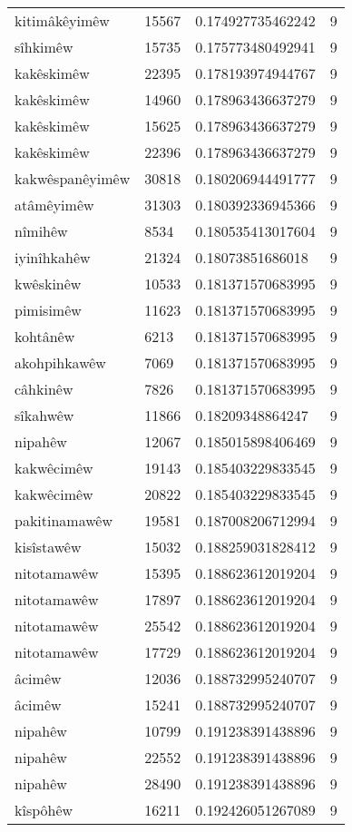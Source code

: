 \begin{longtable}{llll}
kitimâkêyimêw & 15567 & 0.174927735462242 & 9\\
sîhkimêw & 15735 & 0.175773480492941 & 9\\
kakêskimêw & 22395 & 0.178193974944767 & 9\\
kakêskimêw & 14960 & 0.178963436637279 & 9\\
kakêskimêw & 15625 & 0.178963436637279 & 9\\
kakêskimêw & 22396 & 0.178963436637279 & 9\\
kakwêspanêyimêw & 30818 & 0.180206944491777 & 9\\
atâmêyimêw & 31303 & 0.180392336945366 & 9\\
nîmihêw & 8534 & 0.180535413017604 & 9\\
iyinîhkahêw & 21324 & 0.18073851686018 & 9\\
kwêskinêw & 10533 & 0.181371570683995 & 9\\
pimisimêw & 11623 & 0.181371570683995 & 9\\
kohtânêw & 6213 & 0.181371570683995 & 9\\
akohpihkawêw & 7069 & 0.181371570683995 & 9\\
câhkinêw & 7826 & 0.181371570683995 & 9\\
sîkahwêw & 11866 & 0.18209348864247 & 9\\
nipahêw & 12067 & 0.185015898406469 & 9\\
kakwêcimêw & 19143 & 0.185403229833545 & 9\\
kakwêcimêw & 20822 & 0.185403229833545 & 9\\
pakitinamawêw & 19581 & 0.187008206712994 & 9\\
kisîstawêw & 15032 & 0.188259031828412 & 9\\
nitotamawêw & 15395 & 0.188623612019204 & 9\\
nitotamawêw & 17897 & 0.188623612019204 & 9\\
nitotamawêw & 25542 & 0.188623612019204 & 9\\
nitotamawêw & 17729 & 0.188623612019204 & 9\\
âcimêw & 12036 & 0.188732995240707 & 9\\
âcimêw & 15241 & 0.188732995240707 & 9\\
nipahêw & 10799 & 0.191238391438896 & 9\\
nipahêw & 22552 & 0.191238391438896 & 9\\
nipahêw & 28490 & 0.191238391438896 & 9\\
kîspôhêw & 16211 & 0.192426051267089 & 9\\

\end{longtable}
